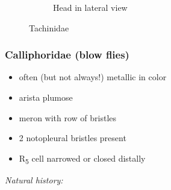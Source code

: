 \documentclass[letterpaper, 11pt]{article}
\begin{document}
\begin{figure}[ht!]
\begin{subfigure}[ht!]{0.21\textwidth}
        \caption{Head in lateral view \citep[][Fig. 110.91]{mcalpine1981manualv2}}
        \label{fig:tachinid2}
    \end{subfigure}
    \caption{Tachinidae}\label{fig:tachinids}
\end{figure}

\subsubsection{Calliphoridae (blow flies)}
\begin{itemize}
\item often (but not always!) metallic in color
\item arista plumose
\item meron with row of bristles
\item 2 notopleural bristles present
\item \texorpdfstring{R\textsubscript{5}}{R5} cell narrowed or closed distally
\end{itemize}

\noindent{}\textit{Natural history:} \\
\end{document}
